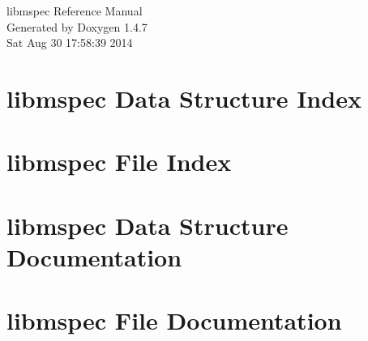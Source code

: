 \documentclass[letterpaper]{book}
\begin{document}
\begin{titlepage}
\vspace*{7cm}
\begin{center}
{\Large libmspec Reference Manual}\\
\vspace*{1cm}
{\large Generated by Doxygen 1.4.7}\\
\vspace*{0.5cm}
{\small Sat Aug 30 17:58:39 2014}\\
\end{center}
\end{titlepage}
\clearemptydoublepage
{}
\tableofcontents
\clearemptydoublepage
{}
\chapter{libmspec Data Structure Index}

\chapter{libmspec File Index}

\chapter{libmspec Data Structure Documentation}



\chapter{libmspec File Documentation}







































\printindex
\end{document}
